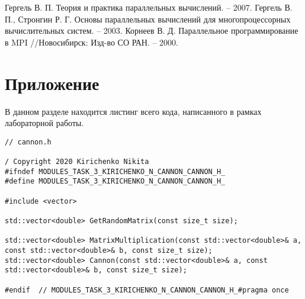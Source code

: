 \documentclass{report}
\begin{document}
\begin{thebibliography}{1}
Гергель В. П. Теория и практика параллельных вычислений. – 2007. 
Гергель В. П., Стронгин Р. Г. Основы параллельных вычислений для многопроцессорных вычислительных систем. – 2003.
Корнеев В. Д. Параллельное программирование в MPI //Новосибирск: Изд-во СО РАН. – 2000.
\end{thebibliography}
\newpage

\section*{Приложение}
В данном разделе находится листинг всего кода, написанного в рамках лабораторной работы.
\begin{lstlisting}
// cannon.h

/ Copyright 2020 Kirichenko Nikita
#ifndef MODULES_TASK_3_KIRICHENKO_N_CANNON_CANNON_H_
#define MODULES_TASK_3_KIRICHENKO_N_CANNON_CANNON_H_

#include <vector>

std::vector<double> GetRandomMatrix(const size_t size);

std::vector<double> MatrixMultiplication(const std::vector<double>& a, const std::vector<double>& b, const size_t size);
std::vector<double> Cannon(const std::vector<double>& a, const std::vector<double>& b, const size_t size);

#endif  // MODULES_TASK_3_KIRICHENKO_N_CANNON_CANNON_H_#pragma once

\end{lstlisting}
\end{document}
